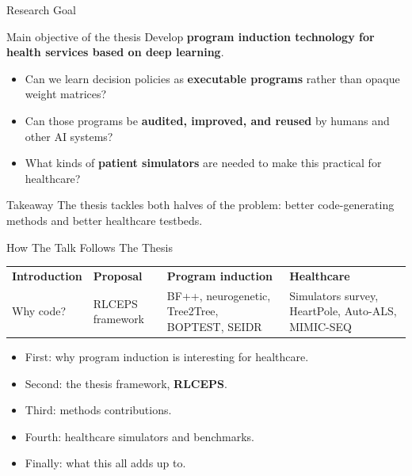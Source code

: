 \documentclass[aspectratio=169,11pt]{beamer}
\newcommand{\takeaway}[1]{%
  \begin{alertblock}{Takeaway}
    #1
  \end{alertblock}
}
\begin{document}
\begin{frame}{Research Goal}
  \begin{block}{Main objective of the thesis}
    Develop \textbf{program induction technology for health services based on deep learning}.
  \end{block}

  \vspace{0.3cm}

  \begin{itemize}
    \item Can we learn decision policies as \textbf{executable programs} rather than opaque weight matrices?
    \item Can those programs be \textbf{audited, improved, and reused} by humans and other AI systems?
    \item What kinds of \textbf{patient simulators} are needed to make this practical for healthcare?
  \end{itemize}

  \takeaway{The thesis tackles both halves of the problem: better code-generating methods and better healthcare testbeds.}
\end{frame}

\begin{frame}{How The Talk Follows The Thesis}
  \begin{tabularx}{\textwidth}{>{\raggedright\arraybackslash}p{} >{\raggedright\arraybackslash}p{} >{\raggedright\arraybackslash}p{} >{\raggedright\arraybackslash}p{}}
    \rowcolor{thesislight}
    \textbf{Introduction} & \textbf{Proposal} & \textbf{Program induction} & \textbf{Healthcare} \\
    Why code? & RLCEPS framework & BF++, neurogenetic, Tree2Tree, BOPTEST, SEIDR & Simulators survey, HeartPole, Auto-ALS, MIMIC-SEQ
  \end{tabularx}

  \vspace{0.6cm}

  \begin{itemize}
    \item First: why program induction is interesting for healthcare.
    \item Second: the thesis framework, \textbf{RLCEPS}.
    \item Third: methods contributions.
    \item Fourth: healthcare simulators and benchmarks.
    \item Finally: what this all adds up to.
  \end{itemize}
\end{frame}
\end{document}

